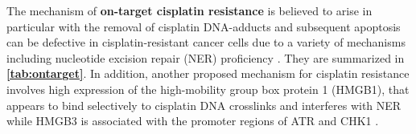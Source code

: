 The mechanism of \textbf{on-target cisplatin resistance} is believed to arise in particular with the removal of cisplatin DNA-adducts and subsequent apoptosis can be defective in cisplatin-resistant cancer cells due to a variety of mechanisms including nucleotide excision repair (NER) proficiency \cite{wood2000dna, shuck2008eukaryotic}. They are summarized in \textbf{\autoref{tab:ontarget}}. In addition, another proposed mechanism for cisplatin resistance involves high expression of the high-mobility group box protein 1 (HMGB1), that appears to bind selectively to cisplatin DNA crosslinks and interferes with \ac{NER} while HMGB3 is associated with the promoter regions of ATR and CHK1 \cite{awuah2017repair, mukherjee2019targeting}. 



